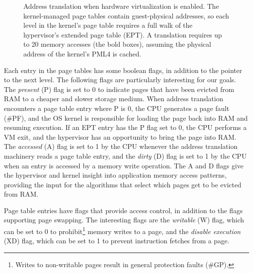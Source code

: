 \begin{figure}[hbtp]
  \caption{
    Address translation when hardware virtualization is enabled. The
    kernel-managed page tables contain guest-physical addresses, so each level
    in the kernel's page table requires a full walk of the hypervisor's
    extended page table (EPT).  A translation requires up to 20 memory accesses
    (the bold boxes), assuming the physical address of the kernel's PML4 is
    cached.
  }
  \label{fig:vmx_paging}
\end{figure}

Each entry in the page tables has some boolean flags, in addition to the
pointer to the next level. The following flags are particularly interesting for
our goals. The \textit{present} (P) flag is set to 0 to indicate pages that
have been evicted from RAM to a cheaper and slower storage medium. When address
translation encounters a page table entry where P is 0, the CPU generates a
page fault (\#PF), and the OS kernel is responsible for loading the page back
into RAM and resuming execution. If an EPT entry has the P flag set to 0, the
CPU performs a VM exit, and the hypervisor has an opportunity to bring the page
into RAM. The \textit{accessed} (A) flag is set to 1 by the CPU whenever the
address translation machinery reads a page table entry, and the \textit{dirty}
(D) flag is set to 1 by the CPU when an entry is accessed by a memory write
operation. The A and D flags give the hypervisor and kernel insight into
application memory access patterns, providing the input for the algorithms that
select which pages get to be evicted from RAM.

Page table entries have flags that provide access control, in addition to the
flags supporting page swapping. The interesting flags are the \textit{writable}
(W) flag, which can be set to 0 to prohibit\footnote{Writes to non-writable
pages result in general protection faults (\#GP).} memory writes to a page, and
the \textit{disable execution} (XD) flag, which can be set to 1 to prevent
instruction fetches from a page.
